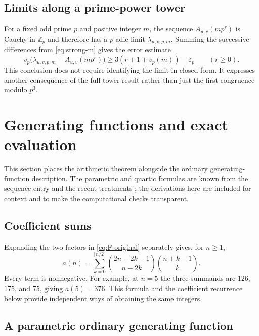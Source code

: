 \documentclass[11pt,a4paper]{article}
\numberwithin{equation}{section}
\theoremstyle{definition}
\theoremstyle{remark}
\newcommand{\Z}{\mathbb Z}
\newcommand{\vp}{v_p}
\newcommand{\epsp}{\varepsilon_p}
\newcommand{\Auv}{A_{u,v}}
\begin{document}
\subsection{Limits along a prime-power tower}

For a fixed odd prime $p$ and positive integer $m$, the sequence
$\Auv(mp^r)$ is Cauchy in $\Z_p$ and therefore has a $p$-adic limit
$\lambda_{u,v,p,m}$. Summing the successive differences from
\eqref{eq:strong-m} gives the error estimate
\[
 \vp\bigl(\lambda_{u,v,p,m}-\Auv(mp^r)\bigr)
 \geq3(r+1+\vp(m))-\epsp\qquad(r\geq0).
\]
This conclusion does not require identifying the limit in closed form.
It expresses another consequence of the full tower result rather than
just the first congruence modulo $p^3$.

\section{Generating functions and exact evaluation}\label{sec:gf}

This section places the arithmetic theorem alongside the ordinary
generating-function description. The parametric and quartic formulas
are known from the sequence entry and the recent treatments
\cite{oeis,niu,prodinger}; the derivations here are included for context
and to make the computational checks transparent.

\subsection{Coefficient sums}

Expanding the two factors in \eqref{eq:F-original} separately gives, for
$n\geq1$,
\begin{equation}\label{eq:positive-sum}
 a(n)=\sum_{k=0}^{\lfloor n/2\rfloor}
 \binom{2n-2k-1}{n-2k}\binom{n+k-1}{k}.
\end{equation}
Every term is nonnegative. For example, at $n=5$ the three summands are
$126$, $175$, and $75$, giving $a(5)=376$.
This formula and the coefficient recurrence below provide independent
ways of obtaining the same integers.

\subsection{A parametric ordinary generating function}
\end{document}
